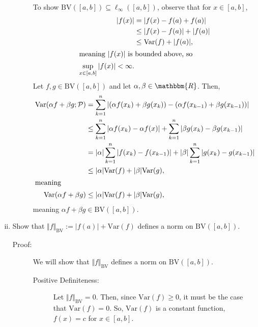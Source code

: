 \documentclass[10pt]{extarticle}
\newcommand{\R}{\mathbbm{R}}
\begin{document}
\begin{enumerate}[(i)]
\begin{description}
          To show $\text{BV}([a,b])\subseteq \ell_{\infty}([a,b])$, observe that for $x\in [a,b]$,
          \begin{align*}
            |f(x)| &= |f(x)-f(a) + f(a)|\\
                   &\leq |f(x)-f(a)| + |f(a)|\\
                   &\leq \text{Var}(f) + |f(a)|,\\
           \shortintertext{meaning $|f(x)|$ is bounded above, so}
           \sup_{x\in[a,b]}|f(x)| < \infty.
          \end{align*}
          Let $f,g\in \text{BV}([a,b])$ and let $\alpha,\beta \in \R$. Then,
          \begin{align*}
            \text{Var}(\alpha f + \beta g;\mathcal{P}) &= \sum_{k=1}^{n}|(\alpha f(x_k) + \beta g(x_k)) - (\alpha f(x_{k-1}) + \beta g(x_{k-1}))|\\
                                                       &\leq\sum_{k=1}^{n}|\alpha f(x_k)-\alpha f(x)| + \sum_{k=1}^{n}|\beta g(x_k)-\beta g(x_{k-1})|\\
                                                       &= |\alpha|\sum_{k=1}^{n}|f(x_k)-f(x_{k-1})| + |\beta|\sum_{k=1}^{n}|g(x_k) - g(x_{k-1})|\\
                                                       &\leq |\alpha|\text{Var}(f) + |\beta|\text{Var}(g),\\
                                                       \shortintertext{meaning}
            \text{Var}(\alpha f + \beta g) &\leq |\alpha|\text{Var}(f) + |\beta|\text{Var}(g),
          \end{align*}
          meaning $\alpha f + \beta g\in \text{BV}([a,b])$.
      \end{description}
    \item Show that $\Vert f\Vert_{\text{BV}} := |f(a)| + \text{Var}(f)$ defines a norm on $\text{BV}([a,b])$.
      \begin{description}
        \item[Proof:] We will show that $\Vert f \Vert_{\text{BV}}$ defines a norm on $\text{BV}([a,b])$.
          \begin{description}
            \item[Positive Definiteness:] Let $\Vert f \Vert_{\text{BV}} = 0$. Then, since $\text{Var}(f) \geq 0$, it must be the case that $\text{Var}(f) = 0$. So, $\text{Var}(f)$ is a constant function, $f(x) = c$ for $x\in [a,b]$.\\


\end{description}
\end{description}
\end{enumerate}
\end{document}

